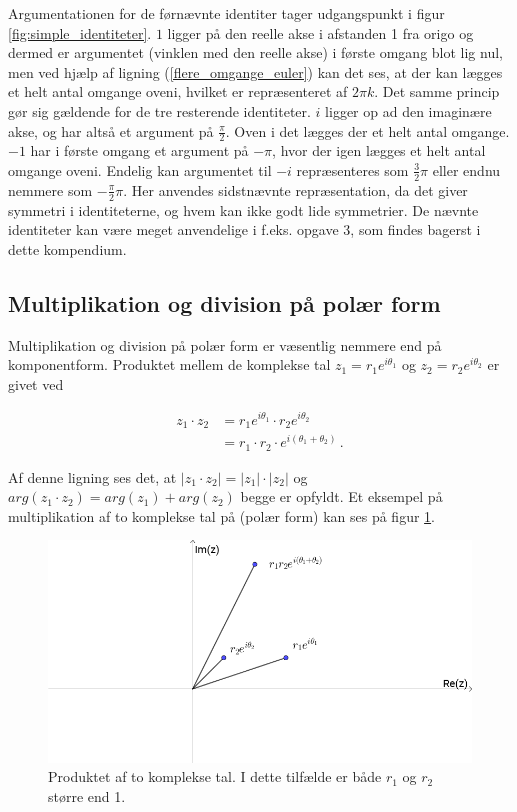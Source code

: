 \documentclass[a4paper, 12pt,titlepage]{article}
\begin{document}
Argumentationen for de førnævnte identiter tager udgangspunkt i figur \ref{fig:simple_identiteter}. \(1\) ligger på den reelle akse i afstanden 1 fra origo og dermed er argumentet (vinklen med den reelle akse) i første omgang blot lig nul, men ved hjælp af ligning (\ref{flere_omgange_euler}) kan det ses, at der kan lægges et helt antal omgange oveni, hvilket er repræsenteret af \(2\pi k\). Det samme princip gør sig gældende for de tre resterende identiteter. \(i\) ligger op ad den imaginære akse, og har altså et argument på \(\frac{\pi}{2}\). Oven i det lægges der et helt antal omgange. \(-1\) har i første omgang et argument på \(- \pi\), hvor der igen lægges et helt antal omgange oveni. Endelig kan argumentet til \(-i\) repræsenteres som \(\frac{3}{2}\pi\) eller endnu nemmere som \(- \frac{\pi}{2}\pi\). Her anvendes sidstnævnte repræsentation, da det giver symmetri i identiteterne, og hvem kan ikke godt lide symmetrier. De nævnte identiteter kan være meget anvendelige i f.eks. opgave 3, som findes bagerst i dette kompendium.

\subsection{Multiplikation og division på polær form}
\label{sec:org70ed5e5}

Multiplikation og division på polær form er væsentlig nemmere end på komponentform. Produktet mellem de komplekse tal \(z_1 =r_1 e^{i \theta_1}\) og \(z_2 =r_2 e^{i \theta_2}\) er givet ved

\begin{align}
	z_1 \cdot z_2 &= r_1 e^{i \theta_1} \cdot r_2 e^{i \theta_2} \nonumber \\
		          &= r_1 \cdot r_2 \cdot e^{i\left(\theta_1 + \theta_2\right)} \,.
\end{align}

Af denne ligning ses det, at \(|z_1 \cdot z_2| = |z_1| \cdot |z_2|\) og \(arg(z_1 \cdot z_2) = arg(z_1) + arg(z_2)\) begge er opfyldt. Et eksempel på multiplikation af to komplekse tal på (polær form) kan ses på figur \ref{polaer_multi}.

\begin{figure}[htbp]
\centering
\includegraphics[width=.9\linewidth]{./img/polaer_multi.png}
\caption{\label{polaer_multi}Produktet af to komplekse tal. I dette tilfælde er både \(r_1\) og \(r_2\) større end 1.}
\end{figure}
\end{document}

